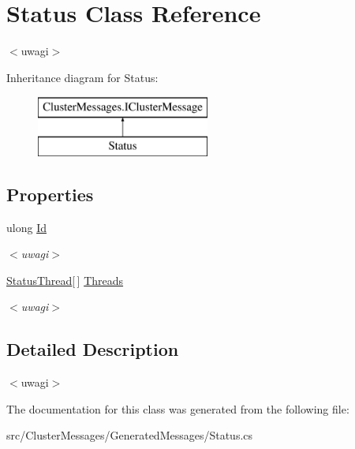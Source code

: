 \hypertarget{class_status}{}\section{Status Class Reference}
\label{class_status}


$<$uwagi$>$  


Inheritance diagram for Status\+:\begin{figure}[H]
\begin{center}
\leavevmode
\includegraphics[height=2.000000cm]{class_status}
\end{center}
\end{figure}
\subsection*{Properties}
\begin{DoxyCompactItemize}
\item 
\hypertarget{class_status_a264728427162227f5edf718944bf8a5a}{}ulong \hyperlink{class_status_a264728427162227f5edf718944bf8a5a}{Id}\label{class_status_a264728427162227f5edf718944bf8a5a}

\begin{DoxyCompactList}\small\item\em $<$uwagi$>$ \end{DoxyCompactList}\item 
\hypertarget{class_status_a9c4063423c7e6840f7f37ed1fdc92672}{}\hyperlink{class_status_thread}{Status\+Thread}\mbox{[}$\,$\mbox{]} \hyperlink{class_status_a9c4063423c7e6840f7f37ed1fdc92672}{Threads}\label{class_status_a9c4063423c7e6840f7f37ed1fdc92672}

\begin{DoxyCompactList}\small\item\em $<$uwagi$>$ \end{DoxyCompactList}\end{DoxyCompactItemize}


\subsection{Detailed Description}
$<$uwagi$>$ 

The documentation for this class was generated from the following file\+:\begin{DoxyCompactItemize}
\item 
src/\+Cluster\+Messages/\+Generated\+Messages/Status.\+cs\end{DoxyCompactItemize}
